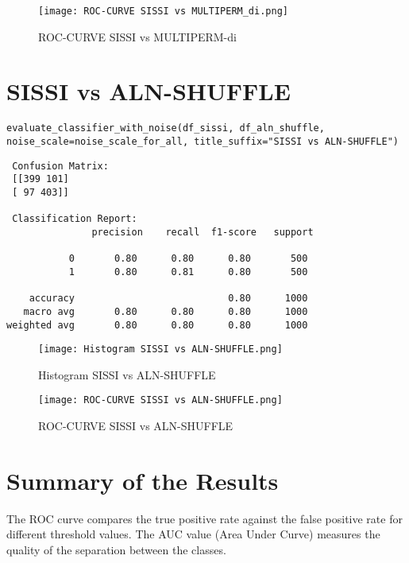\documentclass{article}
\begin{document}
\begin{large}
\begin{large}
\begin{large}
\begin{figure}[H]
    \centering
    \texttt{[image: ROC-CURVE SISSI vs MULTIPERM\_di.png]}
    \caption{ROC-CURVE SISSI vs MULTIPERM-di}
\end{figure}

\clearpage

\section{SISSI vs ALN-SHUFFLE}
\begin{lstlisting}
evaluate_classifier_with_noise(df_sissi, df_aln_shuffle, noise_scale=noise_scale_for_all, title_suffix="SISSI vs ALN-SHUFFLE")
\end{lstlisting}\par

\begin{lstlisting}
 Confusion Matrix:
 [[399 101]
 [ 97 403]]

 Classification Report:
               precision    recall  f1-score   support

           0       0.80      0.80      0.80       500
           1       0.80      0.81      0.80       500

    accuracy                           0.80      1000
   macro avg       0.80      0.80      0.80      1000
weighted avg       0.80      0.80      0.80      1000
\end{lstlisting}\par

\begin{figure}[H]
    \centering
    \texttt{[image: Histogram SISSI vs ALN-SHUFFLE.png]}
    \caption{Histogram SISSI vs ALN-SHUFFLE}
\end{figure}

\begin{figure}[H]
    \centering
    \texttt{[image: ROC-CURVE SISSI vs ALN-SHUFFLE.png]}
    \caption{ROC-CURVE SISSI vs ALN-SHUFFLE}
\end{figure}

\clearpage

\section{Summary of the Results}

The ROC curve compares the true positive rate against the false positive rate for different threshold values. The AUC value (Area Under Curve) measures the quality of the separation between the classes.\vspace{1em}


\end{large}
\end{large}
\end{large}
\end{document}
